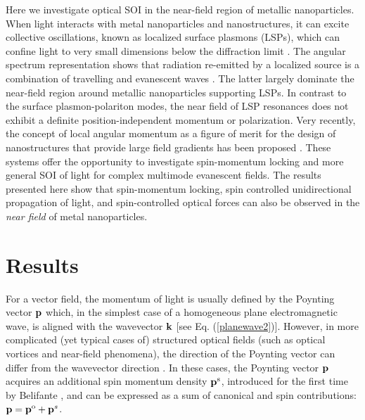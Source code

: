\documentclass[journal=apchd5,manuscript=article]{achemso}
\begin{document}
Here we investigate optical SOI in the near-field region of metallic nanoparticles.
When light interacts with metal nanoparticles and nanostructures, it can excite collective oscillations, known as localized surface plasmons (LSPs), which can confine light to very small dimensions below the diffraction limit \cite{giannini2011plasmonic,triolo2015near}.
The angular spectrum representation shows that radiation re-emitted by a localized source is a combination of travelling and evanescent waves \cite{moreno2013}. The latter largely dominate the near-field region around metallic nanoparticles supporting LSPs. In contrast to the surface plasmon-polariton modes, the near field of LSP resonances does not exhibit a definite position-independent  momentum or polarization.
Very recently, the concept of local angular momentum  as a figure of merit for the
design of nanostructures that provide large field gradients has been proposed \cite{Alabastri2016}. These systems
offer the opportunity to investigate spin-momentum locking and more general SOI of light for complex multimode evanescent fields.
The results presented here show that spin-momentum locking, spin controlled unidirectional propagation of light, and spin-controlled optical forces can also be observed in the \textit{near field} of metal nanoparticles.


\section*{Results}

For a vector field, the momentum of light is usually defined by the Poynting vector ${\bf p}$  which, in the simplest case of a homogeneous plane electromagnetic wave,  is aligned with the wavevector $\bf k$ [see Eq. (\ref{planewave2})]. However, in more complicated (yet typical cases of) structured optical fields (such as optical vortices and near-field phenomena), the direction of the Poynting vector can differ from the wavevector direction \cite{bekshaev2015transverse,rodriguez2013near,bliokh2012spatiotemporal,shitrit2011optical}. In these cases,  the Poynting vector $\bf p$ acquires an additional spin momentum density $\bf p^{\rm s}$,  introduced for the first time by Belifante \cite{belinfante1940,ohanian1986spin}, and can be expressed \cite{bliokh2015} as a sum of canonical and spin contributions: ${\bf p}= {\bf p}^{\rm o} +{\bf p}^s$. 
\end{document}
